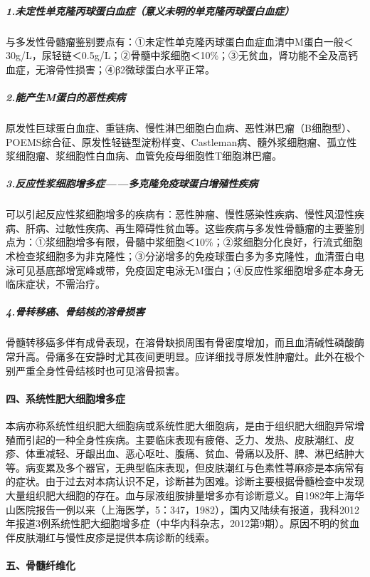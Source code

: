 \subparagraph{1.未定性单克隆丙球蛋白血症（意义未明的单克隆丙球蛋白血症）}

与多发性骨髓瘤鉴别要点有：①未定性单克隆丙球蛋白血症血清中M蛋白一般＜30g/L，尿轻链＜0.5g/L；②骨髓中浆细胞＜10\%；③无贫血，肾功能不全及高钙血症，无溶骨性损害；④β2微球蛋白水平正常。

\subparagraph{2.能产生M蛋白的恶性疾病}

原发性巨球蛋白血症、重链病、慢性淋巴细胞白血病、恶性淋巴瘤（B细胞型）、POEMS综合征、原发性轻链型淀粉样变、Castleman病、髓外浆细胞瘤、孤立性浆细胞瘤、浆细胞性白血病、血管免疫母细胞性T细胞淋巴瘤。

\subparagraph{3.反应性浆细胞增多症------多克隆免疫球蛋白增殖性疾病}

可以引起反应性浆细胞增多的疾病有：恶性肿瘤、慢性感染性疾病、慢性风湿性疾病、肝病、过敏性疾病、再生障碍性贫血等。这些疾病与多发性骨髓瘤的主要鉴别点为：①浆细胞增多有限，骨髓中浆细胞＜10\%；②浆细胞分化良好，行流式细胞术检查浆细胞多为非克隆性；③分泌增多的免疫球蛋白多为多克隆性，血清蛋白电泳可见基底部增宽峰或带，免疫固定电泳无M蛋白；④反应性浆细胞增多症本身无临床症状，不需治疗。

\subparagraph{4.骨转移癌、骨结核的溶骨损害}

骨髓转移癌多伴有成骨表现，在溶骨缺损周围有骨密度增加，而且血清碱性磷酸酶常升高。骨痛多在安静时尤其夜间更明显。应详细找寻原发性肿瘤灶。此外在极个别严重全身性骨结核时也可见溶骨损害。

\paragraph{四、系统性肥大细胞增多症}

本病亦称系统性组织肥大细胞病或系统性肥大细胞病，是由于组织肥大细胞异常增殖而引起的一种全身性疾病。主要临床表现有疲倦、乏力、发热、皮肤潮红、皮疹、体重减轻、牙龈出血、恶心呕吐、腹痛、贫血、骨痛以及肝、脾、淋巴结肿大等。病变累及多个器官，无典型临床表现，但皮肤潮红与色素性荨麻疹是本病常有的症状。由于过去对本病认识不足，诊断甚为困难。诊断主要根据骨髓检查中发现大量组织肥大细胞的存在。血与尿液组胺排量增多亦有诊断意义。自1982年上海华山医院报告一例以来（上海医学，5：347，1982），国内又陆续有报道，我科2012年报道3例系统性肥大细胞增多症（中华内科杂志，2012第9期）。原因不明的贫血伴皮肤潮红与慢性皮疹是提供本病诊断的线索。

\paragraph{五、骨髓纤维化}

